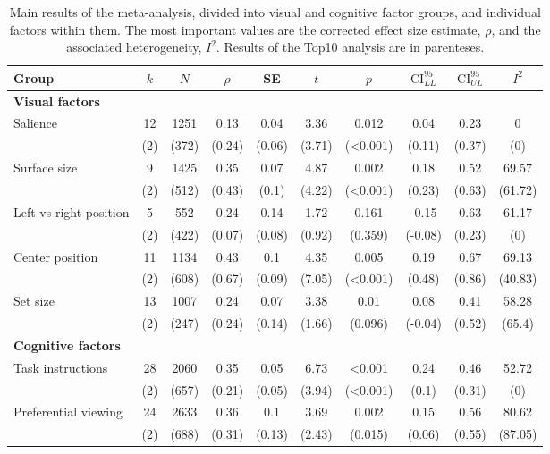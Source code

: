 \begin{table}[ht]
\centering
\caption{Main results of the meta-analysis, divided into visual and cognitive factor groups, and individual factors within them. The most important values are the corrected effect size estimate, $\rho$, and the associated heterogeneity, $I^2$. 
                Results of the Top10 analysis are in parenteses.} 
\label{tab:main_results}
\begingroup\small
\begin{tabular}{lccccccccc}
  \hline
Group & $k$ & $N$ & $\rho$ & SE & $t$ & $p$ & $\textrm{CI}^{95}_{LL}$ & $\textrm{CI}^{95}_{UL}$ & $I^2$ \\ 
  \hline
\textbf{Visual factors} &  &  &  &  &  &  &  &  &  \\ 
  Salience & 12 & 1251 & 0.13 & 0.04 & 3.36 & 0.012 & 0.04 & 0.23 & 0 \\ 
   & (2) & (372) & (0.24) & (0.06) & (3.71) & (<0.001) & (0.11) & (0.37) & (0) \\ 
  Surface size & 9 & 1425 & 0.35 & 0.07 & 4.87 & 0.002 & 0.18 & 0.52 & 69.57 \\ 
   & (2) & (512) & (0.43) & (0.1) & (4.22) & (<0.001) & (0.23) & (0.63) & (61.72) \\ 
  Left vs right position & 5 & 552 & 0.24 & 0.14 & 1.72 & 0.161 & -0.15 & 0.63 & 61.17 \\ 
   & (2) & (422) & (0.07) & (0.08) & (0.92) & (0.359) & (-0.08) & (0.23) & (0) \\ 
  Center position & 11 & 1134 & 0.43 & 0.1 & 4.35 & 0.005 & 0.19 & 0.67 & 69.13 \\ 
   & (2) & (608) & (0.67) & (0.09) & (7.05) & (<0.001) & (0.48) & (0.86) & (40.83) \\ 
  Set size & 13 & 1007 & 0.24 & 0.07 & 3.38 & 0.01 & 0.08 & 0.41 & 58.28 \\ 
   & (2) & (247) & (0.24) & (0.14) & (1.66) & (0.096) & (-0.04) & (0.52) & (65.4) \\ 
  \textbf{Cognitive factors} &  &  &  &  &  &  &  &  &  \\ 
  Task instructions & 28 & 2060 & 0.35 & 0.05 & 6.73 & <0.001 & 0.24 & 0.46 & 52.72 \\ 
   & (2) & (657) & (0.21) & (0.05) & (3.94) & (<0.001) & (0.1) & (0.31) & (0) \\ 
  Preferential viewing & 24 & 2633 & 0.36 & 0.1 & 3.69 & 0.002 & 0.15 & 0.56 & 80.62 \\ 
   & (2) & (688) & (0.31) & (0.13) & (2.43) & (0.015) & (0.06) & (0.55) & (87.05) \\ 

\end{tabular}
\end{table}

